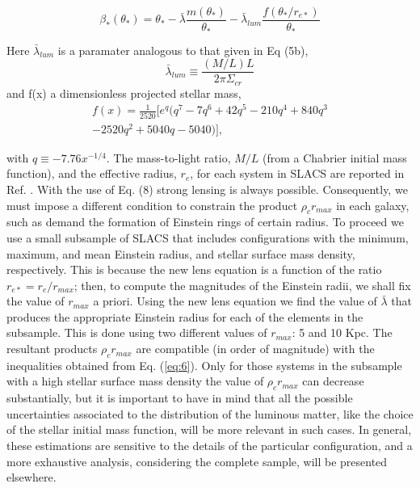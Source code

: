 \documentclass[10pt,letterpaper,twocolumn]{article}
\begin{document}
\begin{equation}
    \tag{8a}\label{eq:8a}
    \beta_{*}(\theta_{*})=\theta_{*}-\bar{\lambda}\frac{m(\theta_{*})}{\theta_{*}}-\bar{\lambda}_{lum}\frac{f(\theta_{*}/r_{e*})}{\theta_{*}}
\end{equation}

Here $\bar{\lambda}_{lum}$ is a paramater analogous to that given in Eq (5b),
\begin{equation}
    \tag{8b}\label{eq:8b}
    \bar{\lambda}_{lum}\equiv\frac{(M/L)L}{2\pi\Sigma_{cr}}
\end{equation}
and f(x) a dimensionless projected stellar mass,
\begin{equation}
\begin{split}
\tag{8c}\label{8c}
    f(x)=\frac{1}{2520}[e^{q}(q^{7}-7q^{6}+42q^{5}-210q^{4}+840q^{3}\\
    -2520q^{2}+5040q-5040)],
\end{split}
\end{equation}

with $q\equiv -7.76x^{-1/4}$. The mass-to-light ratio, $M/L$ (from a Chabrier initial mass function), and the effective radius, $r_{e}$, for each system in SLACS are reported in Ref. \cite{21}. With the use of Eq. (8) strong lensing is always
possible. Consequently, we must impose a different condition to constrain the product $\rho_{c}r_{max}$ in each galaxy, such as demand the formation of Einstein rings of certain radius.
To proceed we use a small subsample of SLACS that includes configurations with the minimum, maximum, and mean Einstein radius, and stellar surface mass density,
respectively. This is because the new lens equation is a function of the ratio $r_{e*} = r_{e}/ r_{max}$; then, to compute the magnitudes of the Einstein radii, we shall fix the value of $r_{max}$ a priori.
Using the new lens equation we find the value of $\bar{\lambda}$ that produces the appropriate Einstein radius for each of the elements in the subsample. This is done using two different values of $r_{max}$: 5 and 10 Kpc. The resultant products $\rho_{c}r_{max}$ are compatible (in order of magnitude) with the inequalities obtained from Eq. (\ref{eq:6}). Only for those systems in the subsample with a high stellar surface mass density the value of $\rho_{c}r_{max}$ can decrease substantially, but it is important to have in mind that all the possible uncertainties associated to the distribution of the luminous matter, like the choice of the stellar initial mass function, will be more relevant in such cases. In general, these estimations are sensitive to the details of the particular configuration, and a more exhaustive analysis, considering the complete sample, will be presented elsewhere.
\end{document}
